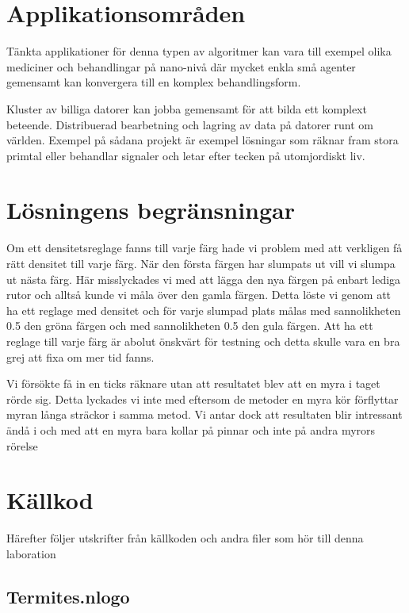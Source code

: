 \documentclass[titlepage, a4paper, 12pt]{article}
\begin{document}
\section{Applikationsområden}

Tänkta applikationer för denna typen av algoritmer kan vara till
exempel olika mediciner och behandlingar på nano-nivå där mycket enkla
små agenter gemensamt kan konvergera till en komplex behandlingsform.

Kluster av billiga datorer kan jobba gemensamt för att bilda ett
komplext beteende. Distribuerad bearbetning och lagring av data på
datorer runt om världen. Exempel på sådana projekt är exempel
lösningar som räknar fram stora primtal eller behandlar signaler och
letar efter tecken på utomjordiskt liv.

\section{Lösningens begränsningar}
Om ett densitetsreglage fanns till varje färg hade vi problem med att
verkligen få rätt densitet till varje färg. När den första färgen har
slumpats ut vill vi slumpa ut nästa färg. Här misslyckades vi med att
lägga den nya färgen på enbart lediga rutor och alltså kunde vi måla
över den gamla färgen. Detta löste vi genom att ha ett reglage med
densitet och för varje slumpad plats målas med sannolikheten 0.5 den
gröna färgen och med sannolikheten 0.5 den gula färgen. Att ha ett
reglage till varje färg är abolut önskvärt för testning och detta
skulle vara en bra grej att fixa om mer tid fanns.

Vi försökte få in en ticks räknare utan att resultatet blev att en
myra i taget rörde sig. Detta lyckades vi inte med eftersom de metoder
en myra kör förflyttar myran långa sträckor i samma metod. Vi antar
dock att resultaten blir intressant ändå i och med att en myra bara
kollar på pinnar och inte på andra myrors rörelse %

\newpage
\appendix
{}
\section{Källkod}\label{sec:kallkod}
Härefter följer utskrifter från källkoden och andra filer som hör till
denna laboration

\subsection{Termites.nlogo}\label{Termites.nlogo}
\begin{footnotesize}
  
\end{footnotesize}
\end{document}

